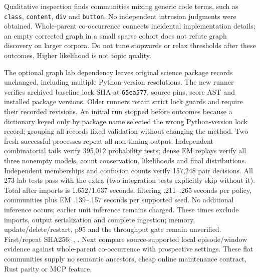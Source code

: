 \documentclass[11pt]{article}
\begin{document}
Qualitative inspection finds communities mixing generic code terms, such as
\texttt{class}, \texttt{content}, \texttt{div} and \texttt{button}. No independent
intrusion judgments were obtained. Whole-parent co-occurrence connects incidental
implementation details; an empty corrected graph in a small sparse cohort does
not refute graph discovery on larger corpora. Do not tune stopwords or relax
thresholds after these outcomes. Higher likelihood is not topic quality.

The optional graph lab dependency leaves original science package records
unchanged, including multiple Python-version resolutions. The new runner
verifies archived baseline lock SHA at \texttt{65ea577}, source pins, score AST
and installed package versions. Older runners retain strict lock guards and
require their recorded revisions. An initial run stopped before outcomes because
a dictionary keyed only by package name selected the wrong Python-version lock
record; grouping all records fixed validation without changing the method.
Two fresh successful processes repeat all non-timing output. Independent
combinatorial tails verify 395,012 probability tests; dense EM replays verify all
three nonempty models, count conservation, likelihoods and final distributions.
Independent memberships and confusion counts verify 157,248 pair decisions.
All 273 lab tests pass with the extra (two integration tests explicitly skip
without it). Total after imports is 1.652/1.637 seconds, filtering .211--.265
seconds per policy, communities plus EM .139--.157 seconds per supported seed.
No additional inference occurs; earlier unit inference remains charged. These
times exclude imports, output serialization and complete ingestion; memory,
update/delete/restart, p95 and the throughput gate remain unverified.
First/repeat SHA256:
,
.
Next compare source-supported local episode/window evidence against whole-parent
co-occurrence with prospective settings. These flat communities supply no
semantic ancestors, cheap online maintenance contract, Rust parity or MCP feature.
\end{document}
